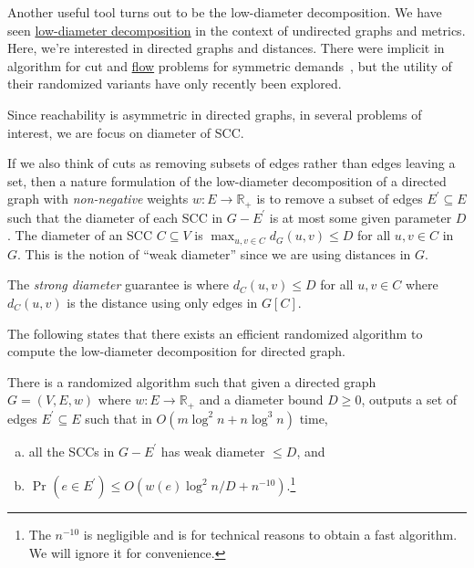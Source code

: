 Another useful tool turns out to be the low-diameter decomposition. We have seen \hyperref[def:low-diameter-decomposition]{low-diameter decomposition} in the context of undirected graphs and metrics. Here, we're interested in directed graphs and distances. There were implicit in algorithm for cut and \hyperref[def:flow]{flow} problems for symmetric demands~\cite{klein1997approximation,seymour1995packing,even2000divide}, but the utility of their randomized variants have only recently been explored.

\begin{intuition}
	Since reachability is asymmetric in directed graphs, in several problems of interest, we are focus on diameter of SCC.
\end{intuition}

If we also think of cuts as removing subsets of edges rather than edges leaving a set, then a nature formulation of the low-diameter decomposition of a directed graph with \emph{non-negative} weights \(w\colon E \to \mathbb{R} _{+}\) is to remove a subset of edges \(E^{\prime} \subseteq E\) such that the diameter of each SCC in \(G - E^{\prime} \) is at most some given parameter \(D\). The diameter of an SCC \(C \subseteq V\) is \(\max _{u, v \in C} d_G(u, v) \leq D\) for all \(u, v \in C\) in \(G\). This is the notion of ``weak diameter'' since we are using distances in \(G\).

\begin{notation}\label{not:strong-diameter}
	The \emph{strong diameter} guarantee is where \(d_C(u, v) \leq D\) for all \(u, v \in C\) where \(d_C(u, v)\) is the distance using only edges in \(G[C]\).
\end{notation}

The following states that there exists an efficient randomized algorithm to compute the low-diameter decomposition for directed graph.

\begin{theorem}\label{thm:directed-LDD}
	There is a randomized algorithm such that given a directed graph \(G = (V, E, w)\) where \(w \colon E \to \mathbb{R} _{+}\) and a diameter bound \(D \geq 0\), outputs a set of edges \(E^{\prime} \subseteq E\) such that in \(O(m \log ^2 n + n \log ^3 n)\) time,
	\begin{enumerate}[(a)]
		\item all the SCCs in \(G - E^{\prime} \) has weak diameter \(\leq D\), and
		\item \(\Pr_{}(e \in E^{\prime} ) \leq O(w(e) \log ^2 n / D + n^{-10})\).\footnote{The \(n^{-10}\) is negligible and is for technical reasons to obtain a fast algorithm. We will ignore it for convenience.}
	\end{enumerate}
\end{theorem}

